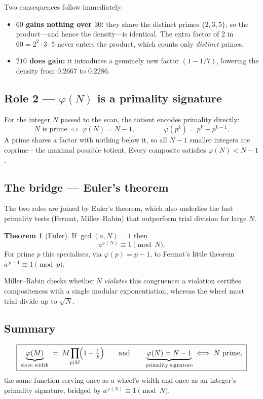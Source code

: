 \documentclass[11pt]{article}
\theoremstyle{definition}
\newtheorem{theorem}{Theorem}
\begin{document}
\noindent Two consequences follow immediately:
\begin{itemize}
  \item \textbf{$60$ gains nothing over $30$:} they share the distinct
        primes $\{2,3,5\}$, so the product---and hence the density---is
        identical. The extra factor of $2$ in $60=2^2\cdot3\cdot5$ never
        enters the product, which counts only \emph{distinct} primes.
  \item \textbf{$210$ does gain:} it introduces a genuinely new factor
        $(1-1/7)$, lowering the density from $0.2667$ to $0.2286$.
\end{itemize}

\subsection*{Role 2 --- $\varphi(N)$ is a primality signature}

For the integer $N$ passed to the scan, the totient encodes primality
directly:
\[
N \text{ is prime} \;\Longleftrightarrow\; \varphi(N) = N-1,
\qquad\qquad
\varphi(p^k) = p^k - p^{k-1}.
\]
A prime shares a factor with nothing below it, so all $N-1$ smaller
integers are coprime---the maximal possible totient. Every composite
satisfies $\varphi(N) < N-1$.

\subsection*{The bridge --- Euler's theorem}

The two roles are joined by Euler's theorem, which also underlies the
fast primality tests (Fermat, Miller--Rabin) that outperform trial
division for large $N$.

\begin{theorem}[Euler]
If $\gcd(a,N)=1$ then
\[
a^{\varphi(N)} \equiv 1 \pmod{N}.
\]
For prime $p$ this specialises, via $\varphi(p)=p-1$, to Fermat's little
theorem $a^{\,p-1}\equiv 1 \pmod p$.
\end{theorem}

Miller--Rabin checks whether $N$ \emph{violates} this congruence: a
violation certifies compositeness with a single modular exponentiation,
whereas the wheel must trial-divide up to $\sqrt N$.

\subsection*{Summary}

\[
\boxed{\;
\underbrace{\varphi(M)}_{\text{sieve width}}
\;=\; M\!\prod_{p\mid M}\!\Bigl(1-\tfrac1p\Bigr)
\qquad\text{and}\qquad
\underbrace{\varphi(N)=N-1}_{\text{primality signature}}
\;\Longleftrightarrow\; N \text{ prime},
\;}
\]
the same function serving once as a wheel's width and once as an integer's
primality signature, bridged by $a^{\varphi(N)}\equiv 1 \pmod N$.
\end{document}
